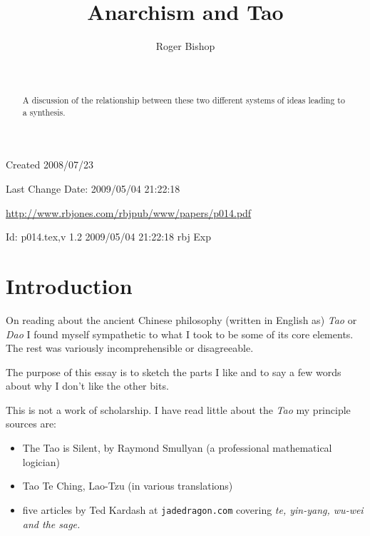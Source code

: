 \documentclass[numreferences]{rbjk}
\def\indexed#1{#1\index{#1}}
\begin{document}
                                                                                   
\begin{article}
\begin{opening}  
\title{Anarchism and Tao}
\author{Roger Bishop }
\date{$ $\ $ $}

\begin{abstract}
A discussion of the relationship between these two different systems of ideas leading to a synthesis.
\end{abstract}

\end{opening}

\vfill

\begin{centering}
\footnotesize{
Created 2008/07/23

Last Change $ $Date: 2009/05/04 21:22:18 $ $

\href{http://www.rbjones.com/rbjpub/www/papers/p014.pdf}{http://www.rbjones.com/rbjpub/www/papers/p014.pdf}

$ $Id: p014.tex,v 1.2 2009/05/04 21:22:18 rbj Exp $ $\\

}%
\end{centering}

\newpage
\setcounter{tocdepth}{4}
{\parskip-0pt\tableofcontents}

\section{Introduction}

On reading about the ancient Chinese philosophy (written in English as) {\it Tao} or {\it Dao} I found myself sympathetic to what I took to be some of its core elements.
The rest was variously incomprehensible or disagreeable.

The purpose of this essay is to sketch the parts I like and to say a few words about why I don't like the other bits.

This is not a work of scholarship.
I have read little about the {\it Tao} my principle sources are:

\begin{itemize}
\item The Tao is Silent\cite{smullyan77}, by Raymond Smullyan (a professional mathematical logician)
\item Tao Te Ching, Lao-Tzu (in various translations)
\item five articles by Ted Kardash at {\tt jadedragon.com} covering \indexed{\it te}, \indexed{\it yin-yang}, \indexed{\it wu-wei} and \indexed{\it the sage}. 
\end{itemize}


\end{article}
\end{document}
